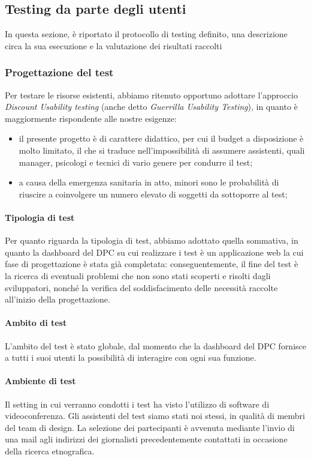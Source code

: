\subsection{Testing da parte degli utenti}
In questa sezione, è riportato il protocollo di testing definito, una descrizione circa la sua esecuzione e la valutazione dei risultati raccolti
\subsubsection{Progettazione del test}
\label{subsubsection:progettazione-del-test}
Per testare le risorse esistenti, abbiamo ritenuto opportuno adottare l'approccio \textit{Discount Usability testing} (anche detto \textit{Guerrilla Usability Testing}), in quanto è maggiormente rispondente alle nostre esigenze: 
\begin{itemize}
    \item il presente progetto è di carattere didattico, per cui il budget a disposizione è molto limitato, il che si traduce nell'impossibilità di assumere assistenti, quali manager, psicologi e tecnici di vario genere per condurre il test;
    \item a causa della emergenza sanitaria in atto, minori sono le probabilità di riuscire a coinvolgere un numero elevato di soggetti da sottoporre al test;
\end{itemize}

\paragraph{Tipologia di test}
Per quanto riguarda la tipologia di test, abbiamo adottato quella sommativa, in quanto la dashboard del DPC su cui realizzare i test è un applicazione web la cui fase di progettazione è stata già completata: conseguentemente, il fine del test è la ricerca di eventuali problemi che non sono stati scoperti e risolti dagli sviluppatori, nonché la verifica del soddisfacimento delle necessità raccolte all'inizio della progettazione.

\paragraph{Ambito di test}
L'ambito del test è stato globale, dal momento che la dashboard del DPC fornisce a tutti i suoi utenti la possibilità di interagire con ogni sua funzione.

\paragraph{Ambiente di test}
Il setting in cui verranno condotti i test ha visto l'utilizzo di software di videoconferenza. Gli assistenti del test siamo stati noi stessi, in qualità di membri del team di design. La selezione dei partecipanti è avvenuta mediante l'invio di una mail agli indirizzi dei giornalisti precedentemente contattati in occasione della ricerca etnografica.


